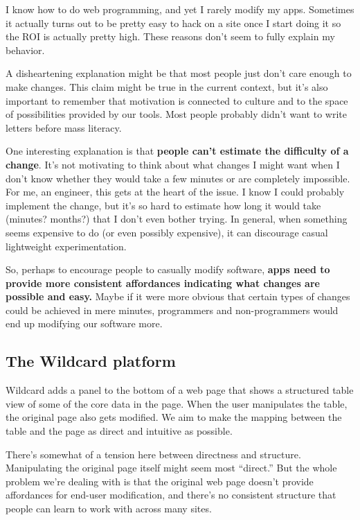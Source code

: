 \documentclass[english,submission]{programming}
\begin{document}
I know how to do web programming, and yet I rarely modify my apps.
Sometimes it actually turns out to be pretty easy to hack on a site once
I start doing it so the ROI is actually pretty high. These reasons don't
seem to fully explain my behavior.

A disheartening explanation might be that most people just don't care
enough to make changes. This claim might be true in the current context,
but it's also important to remember that motivation is connected to
culture and to the space of possibilities provided by our tools. Most
people probably didn't want to write letters before mass literacy.

One interesting explanation is that \textbf{people can't estimate the
difficulty of a change}. It's not motivating to think about what changes
I might want when I don't know whether they would take a few minutes or
are completely impossible. For me, an engineer, this gets at the heart
of the issue. I know I could probably implement the change, but it's so
hard to estimate how long it would take (minutes? months?) that I don't
even bother trying. In general, when something seems expensive to do (or
even possibly expensive), it can discourage casual lightweight
experimentation.

So, perhaps to encourage people to casually modify software,
\textbf{apps need to provide more consistent affordances indicating what
changes are possible and easy.} Maybe if it were more obvious that
certain types of changes could be achieved in mere minutes, programmers
and non-programmers would end up modifying our software more.

\hypertarget{the-wildcard-platform}{%
\subsection{The Wildcard platform}\label{the-wildcard-platform}}

Wildcard adds a panel to the bottom of a web page that shows a
structured table view of some of the core data in the page. When the
user manipulates the table, the original page also gets modified. We aim
to make the mapping between the table and the page as direct and
intuitive as possible.

There's somewhat of a tension here between directness and structure.
Manipulating the original page itself might seem most ``direct.'' But
the whole problem we're dealing with is that the original web page
doesn't provide affordances for end-user modification, and there's no
consistent structure that people can learn to work with across many
sites.
\end{document}
